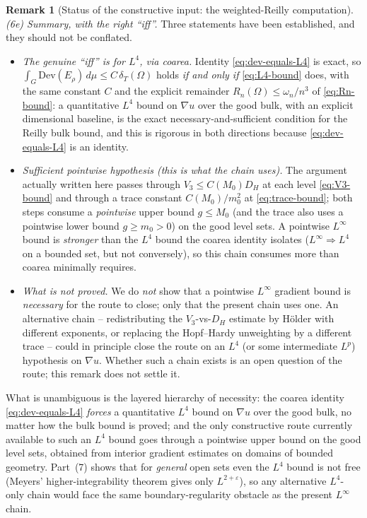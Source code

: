 \documentclass[11pt]{amsart}
\theoremstyle{definition}
\newtheorem{remark}[theorem]{Remark}
\newcommand{\Om}{\Omega}
\newcommand{\dT}{\delta_T}
\newcommand{\eps}{\varepsilon}
\begin{document}
\begin{remark}[Status of the constructive input: the weighted-Reilly computation]
\emph{(6e) Summary, with the right ``iff''.}
Three statements have been established, and they should not be conflated.
\begin{itemize}[leftmargin=2em]
\item \emph{The genuine ``iff'' is for \(L^4\), via coarea.}  Identity
\eqref{eq:dev-equals-L4} is exact, so
\(\int_G\mathrm{Dev}(E_\rho)\,d\mu\le C\,\dT(\Om)\) holds \emph{if and only if}
\eqref{eq:L4-bound} does, with the same constant \(C\) and the explicit
remainder \(R_n(\Om)\le\omega_n/n^3\) of \eqref{eq:Rn-bound}: a quantitative
\(L^4\) bound on \(\nabla u\) over the good bulk, with an explicit dimensional
baseline, is the exact necessary-and-sufficient condition for the Reilly bulk
bound, and this is rigorous in both directions because \eqref{eq:dev-equals-L4}
is an identity.
\item \emph{Sufficient pointwise hypothesis (this is what the chain uses).}
The argument actually written here passes through \(V_3\le C(M_0)D_H\) at each
level \eqref{eq:V3-bound} and through a trace constant
\(C(M_0)/m_0^2\) at \eqref{eq:trace-bound}; both steps consume a
\emph{pointwise} upper bound \(g\le M_0\) (and the trace also uses a pointwise
lower bound \(g\ge m_0>0\)) on the good level sets.  A pointwise \(L^\infty\)
bound is \emph{stronger} than the \(L^4\) bound the coarea identity isolates
(\(L^\infty\Rightarrow L^4\) on a bounded set, but not conversely), so this chain
consumes more than coarea minimally requires.
\item \emph{What is \emph{not} proved.}  We do \emph{not} show that a pointwise
\(L^\infty\) gradient bound is \emph{necessary} for the route to close; only
that the present chain uses one.  An alternative chain -- redistributing the
\(V_3\)-vs-\(D_H\) estimate by H\"older with different exponents, or replacing
the Hopf--Hardy unweighting by a different trace -- could in principle close the
route on an \(L^4\) (or some intermediate \(L^p\)) hypothesis on \(\nabla u\).
Whether such a chain exists is an open question of the route; this remark does
not settle it.
\end{itemize}
What is unambiguous is the layered hierarchy of necessity: the coarea identity
\eqref{eq:dev-equals-L4} \emph{forces} a quantitative \(L^4\) bound on
\(\nabla u\) over the good bulk, no matter how the bulk bound is proved; and the
only constructive route currently available to such an \(L^4\) bound goes
through a pointwise upper bound on the good level sets, obtained from interior
gradient estimates on domains of bounded geometry.  Part~(7) shows that for
\emph{general} open sets even the \(L^4\) bound is not free (Meyers'
higher-integrability theorem gives only \(L^{2+\eps}\)), so any alternative
\(L^4\)-only chain would face the same boundary-regularity obstacle as the
present \(L^\infty\) chain.


\end{remark}
\end{document}
